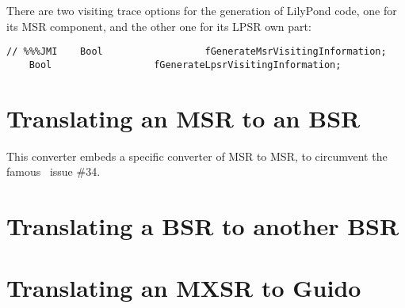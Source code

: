 


There are two visiting trace options for the generation of LilyPond code, one for its MSR component, and the other one for its LPSR own part:
\begin{lstlisting}[language=CPlusPlus]
// %%%JMI    Bool                  fGenerateMsrVisitingInformation;
    Bool                  fGenerateLpsrVisitingInformation;
\end{lstlisting}


\section{Translating an MSR to an BSR}

This converter embeds a specific converter of MSR to MSR, to circumvent the famous \lily\ issue \#34.


\section{Translating a BSR to another BSR}


\section{Translating an MXSR to Guido}


